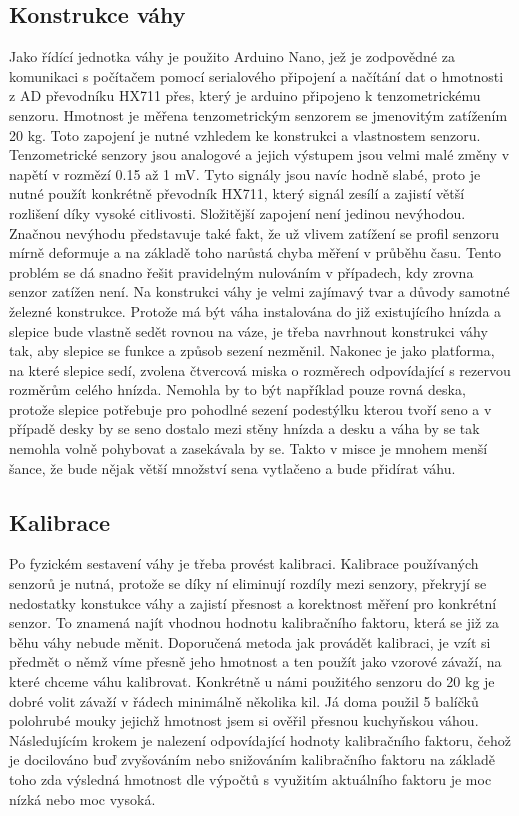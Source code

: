 \subsection*{Konstrukce váhy}
Jako řídící jednotka váhy je použito Arduino Nano, jež je zodpovědné za komunikaci s počítačem pomocí serialového připojení a načítání dat o hmotnosti z AD převodníku HX711 přes, který je arduino připojeno k tenzometrickému senzoru.
Hmotnost je měřena tenzometrickým senzorem se jmenovitým zatížením 20 kg.
Toto zapojení je nutné vzhledem ke konstrukci a vlastnostem senzoru.
Tenzometrické senzory jsou analogové a jejich výstupem jsou velmi malé změny v napětí v rozmězí 0.15 až 1 mV.
Tyto signály jsou navíc hodně slabé, proto je nutné použít konkrétně převodník HX711, který signál zesílí a zajistí větší rozlišení díky vysoké citlivosti.
Složitější zapojení není jedinou nevýhodou.
Značnou nevýhodu představuje také fakt, že už vlivem zatížení se profil senzoru mírně deformuje a na základě toho narůstá chyba měření v průběhu času.
Tento problém se dá snadno řešit pravidelným nulováním v případech, kdy zrovna senzor zatížen není.
Na konstrukci váhy je velmi zajímavý tvar a důvody samotné železné konstrukce.
Protože má být váha instalována do již existujícího hnízda a slepice bude vlastně sedět rovnou na váze, je třeba navrhnout konstrukci váhy tak, aby slepice se funkce a způsob sezení nezměnil.
Nakonec je jako platforma, na které slepice sedí, zvolena čtvercová miska o rozměrech odpovídající s rezervou rozměrům celého hnízda.
Nemohla by to být například pouze rovná deska, protože slepice potřebuje pro pohodlné sezení podestýlku kterou tvoří seno a v případě desky by se seno dostalo mezi stěny hnízda a desku a váha by se tak nemohla volně pohybovat a zasekávala by se.
Takto v misce je mnohem menší šance, že bude nějak větší množství sena vytlačeno a bude přidírat váhu.

\subsection*{Kalibrace}
Po fyzickém sestavení váhy je třeba provést kalibraci.
Kalibrace používaných senzorů je nutná, protože se díky ní eliminují rozdíly mezi senzory, překryjí se nedostatky konstukce váhy a zajistí přesnost a korektnost měření pro konkrétní senzor.
To znamená najít vhodnou hodnotu kalibračního faktoru, která se již za běhu váhy nebude měnit.
Doporučená metoda jak provádět kalibraci, je vzít si předmět o němž víme přesně jeho hmotnost a ten použít jako vzorové závaží, na které chceme váhu kalibrovat.
Konkrétně u námi použitého senzoru do 20 kg je dobré volit závaží v řádech minimálně několika kil.
Já doma použil 5 balíčků polohrubé mouky jejichž hmotnost jsem si ověřil přesnou kuchyňskou váhou.
Následujícím krokem je nalezení odpovídající hodnoty kalibračního faktoru, čehož je docilováno buď zvyšováním nebo snižováním kalibračního faktoru na základě toho zda výsledná hmotnost dle výpočtů s využitím aktuálního faktoru je moc nízká nebo moc vysoká.


